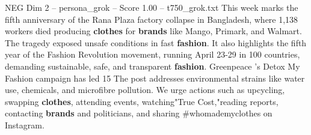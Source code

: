 \begin{textsample}{NEG Dim 2 – persona\_grok – Score 1.00 – t750\_grok.txt}  \label{ex:f2_neg_029}
This week marks the fifth anniversary of the Rana Plaza factory collapse in Bangladesh, where 1,138 workers died producing \textbf{clothes} for \textbf{brands} like Mango, Primark, and Walmart.
The tragedy exposed unsafe conditions in fast \textbf{fashion}.
It also highlights the fifth year of the Fashion Revolution movement, running April 23-29 in 100 countries, demanding sustainable, safe, and transparent \textbf{fashion}.
Greenpeace 's Detox My Fashion campaign has led 15 %
The post addresses environmental strains like water use, chemicals, and microfibre pollution.
We urge actions such as upcycling, swapping \textbf{clothes}, attending events, watching"True Cost,"reading reports, contacting \textbf{brands} and politicians, and sharing \#whomademyclothes on Instagram.

\end{textsample}
